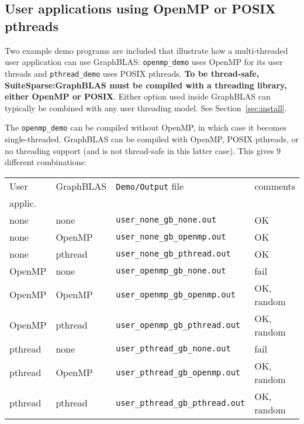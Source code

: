 \documentclass[12pt]{article}
\begin{document}
\newpage
\subsection{User applications using OpenMP or POSIX pthreads}
\label{threads}

Two example demo programs are included that illustrate how a multi-threaded
user application can use GraphBLAS:  \verb'openmp_demo' uses OpenMP for its
user threads and \verb'pthread_demo' uses POSIX pthreads.  {\bf To be
thread-safe, SuiteSparse:GraphBLAS must be compiled with a threading library,
either OpenMP or POSIX}.  Either option used inside GraphBLAS can typically be
combined with any user threading model.  See Section~\ref{sec:install}.

The \verb'openmp_demo' can be compiled without OpenMP, in which case it
becomes single-threaded.  GraphBLAS can be compiled with OpenMP, POSIX
pthreads, or no threading support (and is not thread-safe in this latter
case).  This gives 9 different combinations:

\vspace{0.1in}
{\footnotesize
\begin{tabular}{llll}
\hline
User    & GraphBLAS & \verb'Demo/Output' file & comments \\
applic. &           & & \\
\hline
none    & none      & \verb'user_none_gb_none.out'      & OK \\
none    & OpenMP    & \verb'user_none_gb_openmp.out'    & OK \\
none    & pthread   & \verb'user_none_gb_pthread.out'   & OK \\
\hline
OpenMP  & none      & \verb'user_openmp_gb_none.out'    & fail \\
OpenMP  & OpenMP    & \verb'user_openmp_gb_openmp.out'  & OK, random \\
OpenMP  & pthread   & \verb'user_openmp_gb_pthread.out' & OK, random \\
\hline
pthread & none      & \verb'user_pthread_gb_none.out'   & fail \\
pthread & OpenMP    & \verb'user_pthread_gb_openmp.out' & OK, random \\
pthread & pthread   & \verb'user_pthread_gb_pthread.out'& OK, random \\
\hline
\end{tabular}}
\vspace{0.1in}
\end{document}
